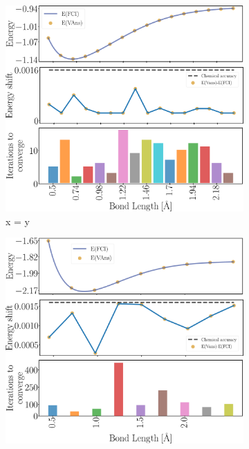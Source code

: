 \begin{figure}
\centering
  \begin{subfigure}[b]{.49\textwidth}
      \centering
      \includegraphics[width=1.\textwidth]{Figures/VANS/Fig9.pdf}
      \caption{x = y}
  \end{subfigure}
  \hfill
  \begin{subfigure}[b]{.49\textwidth}
      \centering
      \includegraphics[width=1.\textwidth]{Figures/VANS/Fig12.pdf}

\end{subfigure}
\end{figure}
